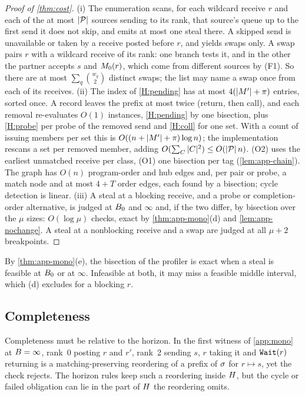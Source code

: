 \begin{proof}[Proof of \cref{thm:cost}]
(i) The enumeration scans, for each wildcard receive $r$ and each of the at most $|\mathcal{P}|$
sources sending to its rank, that source's queue up to the first send it does not skip, and
emits at most one steal there. A skipped send is unavailable or taken by a receive posted before
$r$, and yields swaps only. A swap pairs $r$ with a wildcard receive of its rank: one branch
tests it, and in the other the partner accepts $s$ and $M_0(r)$, which come from different
sources by (F1). So there are at most $\sum_q\binom{w_q}{2}$ distinct swaps; the list may name a
swap once from each of its receives.
(ii) The index of \ref{H:pending} has at most $4(|M'|+\pi)$ entries, sorted once. A record
leaves the prefix at most twice (return, then call), and each removal re-evaluates $O(1)$
instances, \ref{H:pending} by one bisection, plus \ref{H:probe} per probe of the removed send
and \ref{H:coll} for one set. With a count of issuing members per set this is
$O((n+|M'|+\pi)\log n)$; the implementation rescans a set per removed member, adding
$O(\sum_C|C|^2)\le O(|\mathcal{P}|\,n)$. (O2) uses the earliest unmatched receive per class, (O1) one
bisection per tag (\cref{lem:app-chain}). The graph has $O(n)$ program-order and hub edges and,
per pair or probe, a match node and at most $4+T$ order edges, each found by a bisection; cycle
detection is linear.
(iii) A steal at a blocking receive, and a probe or completion-order alternative, is judged at
$B_0$ and $\infty$ and, if the two differ, by bisection over the $\mu$ sizes: $O(\log \mu)$
checks, exact by \cref{thm:app-mono}(d) and \cref{lem:app-nochange}. A steal at a nonblocking
receive and a swap are judged at all $\mu+2$ breakpoints.
\end{proof}

By \cref{thm:app-mono}(e), the bisection of the profiler is exact when a
steal is feasible at $B_0$ or at $\infty$. Infeasible at both, it may miss a feasible middle
interval, which (d) excludes for a blocking $r$.

\subsection{Completeness}
\label{app:complete}

Completeness must be relative to the horizon. In the first witness of \cref{app:mono} at
$B=\infty$, rank~0 posting $r$ and $r'$, rank~2 sending $s$, $r$ taking it and
$\texttt{Wait}(r)$ returning is a matching-preserving reordering of a prefix of $\sigma$ for
$r\mapsto s$, yet the check rejects. The horizon rules keep such a reordering inside $H$,
but the cycle or failed obligation can lie in the part of $H$ the reordering omits.

